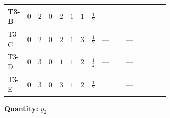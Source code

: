 \documentclass[8pt]{article}
\begin{document}
\begin{landscape}
\begin{longtable}{@{}llcccccc >{\raggedright\arraybackslash}p{0.21\linewidth} >{\raggedright\arraybackslash}p{0.21\linewidth} >{\raggedright\arraybackslash}p{0.21\linewidth}@{}}
\midrule
T3-B & $0$ & $2$ & $0$ & $2$ & $1$ & $1$ & $\frac{1}{2}$ & \scriptsize\adjustbox{max width=\linewidth}{$\begin{gathered} T_{\nu}^{(2)} \left({y_2}\right)_{ij}\end{gathered}$} & \scriptsize\adjustbox{max width=\linewidth}{$\begin{gathered} +\frac{1}{2} (\left({y_1}\,\left({y_1}\right)^{\dagger}\,{y_2}\right)_{ij}+\left({Y_e}\,\left({Y_e}\right)^{\dagger}\,{y_2}\right)_{ij}+3 \left({y_2}\,\left({y_2}\right)^{\dagger}\,{y_2}\right)_{ij})\end{gathered}$} & \scriptsize\adjustbox{max width=\linewidth}{$\begin{gathered} -\frac{9}{4} {g_2}^2 \left({y_2}\right)_{ij}\end{gathered}$} \\
\midrule
T3-C & $0$ & $2$ & $0$ & $2$ & $1$ & $3$ & $\frac{1}{2}$ & --- & --- & \scriptsize\adjustbox{max width=\linewidth}{$\begin{gathered} -\frac{33}{4} {g_2}^2 \left({y_2}\right)_{ij}\end{gathered}$} \\
\midrule
T3-D & $0$ & $3$ & $0$ & $1$ & $1$ & $2$ & $\frac{1}{2}$ & --- & --- & \scriptsize\adjustbox{max width=\linewidth}{$\begin{gathered} -\frac{9}{2} {g_2}^2 \left({y_2}\right)_{ij}\end{gathered}$} \\
\midrule
T3-E & $0$ & $3$ & $0$ & $3$ & $1$ & $2$ & $\frac{1}{2}$ & \scriptsize\adjustbox{max width=\linewidth}{$\begin{gathered} T_{\nu}^{(2)} \left({y_2}\right)_{ij}\end{gathered}$} & --- & \scriptsize\adjustbox{max width=\linewidth}{$\begin{gathered} -\frac{9}{2} {g_2}^2 \left({y_2}\right)_{ij}\end{gathered}$} \\
\midrule
\bottomrule
\end{longtable}
\clearpage
\noindent\textbf{Quantity: }$y_2$\par\smallskip

\end{landscape}
\end{document}
